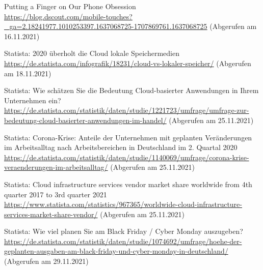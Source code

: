 \begin{thebibliography}{HR08}
    Putting a Finger on Our Phone Obsession\\
 \url{https://blog.dscout.com/mobile-touches?_ga=2.18241977.1010253397.1637068725-1707869761.1637068725}
 (Abgerufen am 16.11.2021)

    Statista: 2020 überholt die Cloud lokale Speichermedien\\
 \url{https://de.statista.com/infografik/18231/cloud-vs-lokaler-speicher/}
 (Abgerufen am 18.11.2021)

    Statista: Wie schätzen Sie die Bedeutung Cloud-basierter Anwendungen in Ihrem Unternehmen ein?\\
 \url{https://de.statista.com/statistik/daten/studie/1221723/umfrage/umfrage-zur-bedeutung-cloud-basierter-anwendungen-im-handel/}
 (Abgerufen am 25.11.2021) 
  
    Statista: Corona-Krise: Anteile der Unternehmen mit geplanten Veränderungen im Arbeitsalltag nach Arbeitsbereichen in Deutschland im 2. Quartal 2020\\
 \url{https://de.statista.com/statistik/daten/studie/1140069/umfrage/corona-krise-veraenderungen-im-arbeitsalltag/}
 (Abgerufen am 25.11.2021) 
   
   Statista: Cloud infrastructure services vendor market share worldwide from 4th quarter 2017 to 3rd quarter 2021\\
 \url{https://www.statista.com/statistics/967365/worldwide-cloud-infrastructure-services-market-share-vendor/}
 (Abgerufen am 25.11.2021) 
  
  Statista: Wie viel planen Sie am Black Friday / Cyber Monday auszugeben? \\
 \url{https://de.statista.com/statistik/daten/studie/1074692/umfrage/hoehe-der-geplanten-ausgaben-am-black-friday-und-cyber-monday-in-deutschland/}
 (Abgerufen am 29.11.2021) 

\end{thebibliography}


